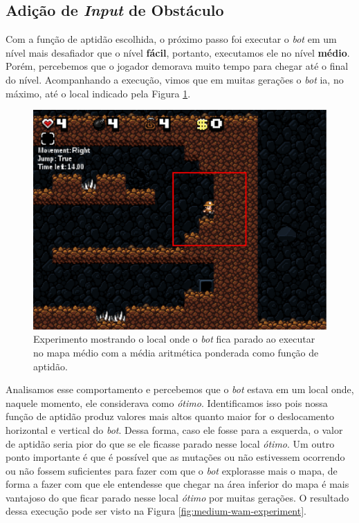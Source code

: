 \subsection{\label{section:obstacle-experiment}Adição de \textit{Input} de
Obstáculo}

Com a função de aptidão escolhida, o próximo passo foi executar o \textit{bot}
em um nível mais desafiador que o nível \textbf{fácil}, portanto, executamos
ele no nível \textbf{médio}. Porém, percebemos que o jogador demorava muito
tempo para chegar até o final do nível. Acompanhando a execução, vimos que em
muitas gerações o \textit{bot} ia, no máximo, até o local indicado pela Figura
\ref{fig:experiment-medium-stuck}.

\begin{figure}[htb!]
\centering
\includegraphics[width=.5\textwidth]{fig/experiment-medium-stuck.pdf}
\caption{Experimento mostrando o local onde o \textit{bot} fica parado ao
    executar no mapa médio com a média aritmética ponderada como função de
    aptidão.}
\label{fig:experiment-medium-stuck}
\end{figure}

Analisamos esse comportamento e percebemos que o \textit{bot} estava em um
local onde, naquele momento, ele considerava como \textit{ótimo}. Identificamos
isso pois nossa função de aptidão produz valores mais altos quanto maior for o
deslocamento horizontal e vertical do \textit{bot}. Dessa forma, caso ele fosse
para a esquerda, o valor de aptidão seria pior do que se ele ficasse parado
nesse local \textit{ótimo}. Um outro ponto importante é que é possível que as
mutações ou não estivessem ocorrendo ou não fossem suficientes para fazer com
que o \textit{bot} explorasse mais o mapa, de forma a fazer com que ele
entendesse que chegar na área inferior do mapa é mais vantajoso do que ficar
parado nesse local \textit{ótimo} por muitas gerações. O resultado dessa
execução pode ser visto na Figura \ref{fig:medium-wam-experiment}.

